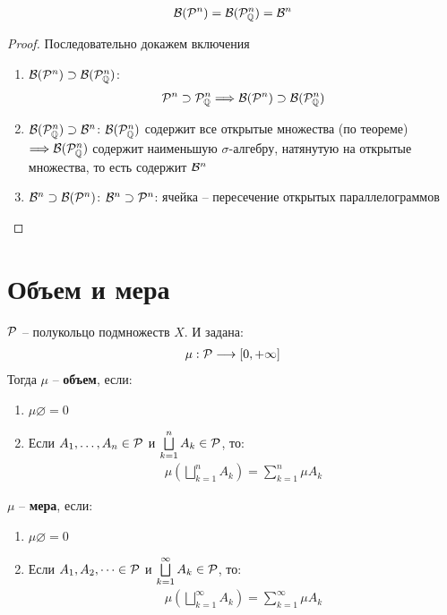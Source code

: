 \follow 
\begin{gather*}
  \mathcal{B} (\mathcal{P}^n) = \mathcal{B} (\mathcal{P}_{\mathbb{Q}}^n) = \mathcal{B}^n
\end{gather*}

\begin{proof}
  Последовательно докажем включения
  \begin{enumerate}
    \item $\mathcal{B} (\mathcal{P}^n) \supset \mathcal{B} (\mathcal{P}_{\mathbb{Q}}^n)$:
    \begin{gather*}
      \mathcal{P}^n \supset \mathcal{P}^n_{\mathbb{Q}} \Longrightarrow \mathcal{B} (\mathcal{P}^n) \supset \mathcal{B} (\mathcal{P}_{\mathbb{Q}}^n)
    \end{gather*}
    \item $\mathcal{B} (\mathcal{P}_{\mathbb{Q}}^n) \supset \mathcal{B}^n$:
    $\mathcal{B}(\mathcal{P}_{\mathbb{Q}}^n)$ содержит все открытые множества (по теореме) $\Longrightarrow \mathcal{B}(\mathcal{P}_{\mathbb{Q}}^n)$ содержит наименьшую $\sigma$-алгебру, натянутую на открытые множества, то есть содержит $\mathcal{B}^n$
    \item $\mathcal{B}^n \supset \mathcal{B} (\mathcal{P}^n)$: $\mathcal{B}^n \supset \mathcal{P}^n$: ячейка -- пересечение открытых параллелограммов
  \end{enumerate}
\end{proof}

\section{Объем и мера}

\begin{conj}
  $\mathcal{P}$ -- полукольцо подмножеств $X$. И задана:
  \begin{gather*}
    \mu : \mathcal{P} \longrightarrow [0, +\infty]
  \end{gather*}
  Тогда $\mu$ -- \textbf{объем}, если:
  \begin{enumerate}
    \item $\mu \varnothing = 0$
    \item Если $A_1, \dots, A_n \in \mathcal{P}$ и $\bigsqcup\limits_{k=1}^n A_k \in \mathcal{P}$, то:
    \begin{gather*}
      \mu \left( \bigsqcup\limits_{k=1}^n A_k \right) = \sum\limits_{k=1}^n \mu A_k
    \end{gather*}
  \end{enumerate}
\end{conj}

\begin{conj}
  $\mu$ -- \textbf{мера}, если:
  \begin{enumerate}
    \item $\mu \varnothing = 0$
    \item Если $A_1, A_2, \dots \in \mathcal{P}$ и $\bigsqcup\limits_{k=1}^\infty A_k \in \mathcal{P}$, то:
    \begin{gather*}
      \mu \left( \bigsqcup\limits_{k=1}^\infty A_k \right) = \sum\limits_{k=1}^\infty \mu A_k
    \end{gather*}
  \end{enumerate}
\end{conj}

